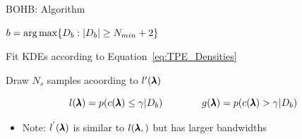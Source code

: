 \begin{frame}{BOHB: Algorithm}

\begin{center}
\begin{minipage}{0.75\textwidth}
\begin{algorithm}[H]
    \LinesNumbered
    \SetAlgoLined
    \setcounter{AlgoLine}{0}
    \DeclarePairedDelimiter\ceil{\lceil}{\rceil}
    \DeclarePairedDelimiter\floor{\lfloor}{\rfloor}
    \DeclarePairedDelimiter\abs{\lvert}{\rvert}
    
    $b=\operatorname*{arg\,max} \{D_b:\lvert D_b \rvert \geq N_{min}+2\}$
    
    
    Fit KDEs according to Equation~\ref{eq:TPE_Densities}
    
    Draw $N_s$ samples acoording to $l'(\pmb{\lambda})$
    
       
    \caption*{Pseudocode for sampling in BOHB}
\end{algorithm}
\end{minipage}
\end{center}

\fhpause
\begin{equation}
    l(\pmb{\lambda})=p(c({\pmb{\lambda}}) \le \gamma| D_b)\quad\quad\quad\quad
    g(\pmb{\lambda})=p(c({\pmb{\lambda}})>\gamma| D_b)
    \label{eq:TPE_Densities}
\end{equation}

\fhpause
\begin{itemize}
	\item Note: $l^{'}(\pmb{\lambda})$ is similar to $l(\pmb{\lambda},)$ but has larger bandwidths
\end{itemize}

\end{frame}
